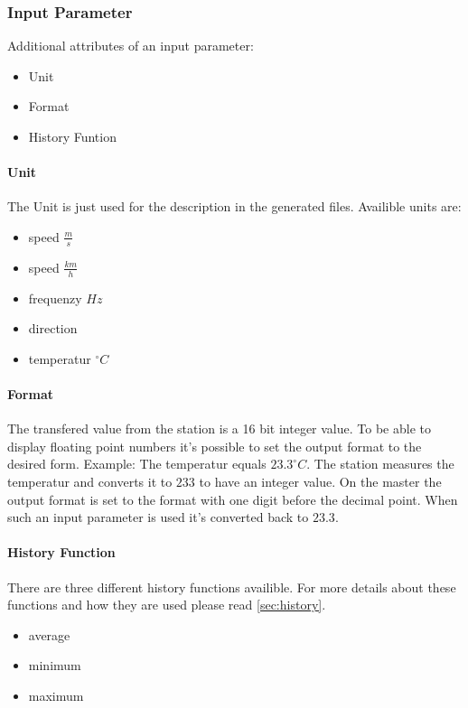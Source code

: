 \subsubsection{Input Parameter} %
\label{ssub:input_parameter}
Additional attributes of an input parameter:
\begin{itemize}
	\item Unit
	\item Format
	\item History Funtion
\end{itemize}

\paragraph{Unit} %
\label{par:unit}
The Unit is just used for the description in the generated files. Availible units are:
\begin{itemize}
	\item speed $\frac{m}{s}$
	\item speed $\frac{km}{h}$
	\item frequenzy $Hz$
	\item direction
	\item temperatur $^\circ C$
\end{itemize}


\paragraph{Format} %
\label{par:format}
The transfered value from the station is a 16 bit integer value. To be able to display floating point numbers it's possible to set the output format to the desired form. Example: The temperatur equals $23.3 ^\circ C$. The station measures the temperatur and converts it to $233$ to have an integer value. On the master the output format is set to the format with one digit before the decimal point. When such an input parameter is used it's converted back to $23.3$.

\paragraph{History Function} %
There are three different history functions availible. For more details about these functions and how they are used please read \ref{sec:history}.
\label{par:history_function}
\begin{itemize}
    \item average
    \item minimum
    \item maximum
\end{itemize}

